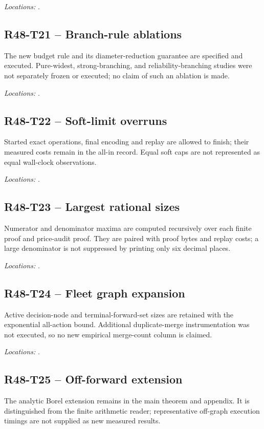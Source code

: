 \noindent\emph{Locations:} .

\subsection{R48-T21 -- Branch-rule ablations}
The new budget rule and its diameter-reduction guarantee are specified and executed. Pure-widest, strong-branching, and reliability-branching studies were not separately frozen or executed; no claim of such an ablation is made.

\noindent\emph{Locations:} .

\subsection{R48-T22 -- Soft-limit overruns}
Started exact operations, final encoding and replay are allowed to finish; their measured costs remain in the all-in record. Equal soft caps are not represented as equal wall-clock observations.

\noindent\emph{Locations:} .

\subsection{R48-T23 -- Largest rational sizes}
Numerator and denominator maxima are computed recursively over each finite proof and price-audit proof. They are paired with proof bytes and replay costs; a large denominator is not suppressed by printing only six decimal places.

\noindent\emph{Locations:} .

\subsection{R48-T24 -- Fleet graph expansion}
Active decision-node and terminal-forward-set sizes are retained with the exponential all-action bound. Additional duplicate-merge instrumentation was not executed, so no new empirical merge-count column is claimed.

\noindent\emph{Locations:} .

\subsection{R48-T25 -- Off-forward extension}
The analytic Borel extension remains in the main theorem and appendix. It is distinguished from the finite arithmetic reader; representative off-graph execution timings are not supplied as new measured results.

